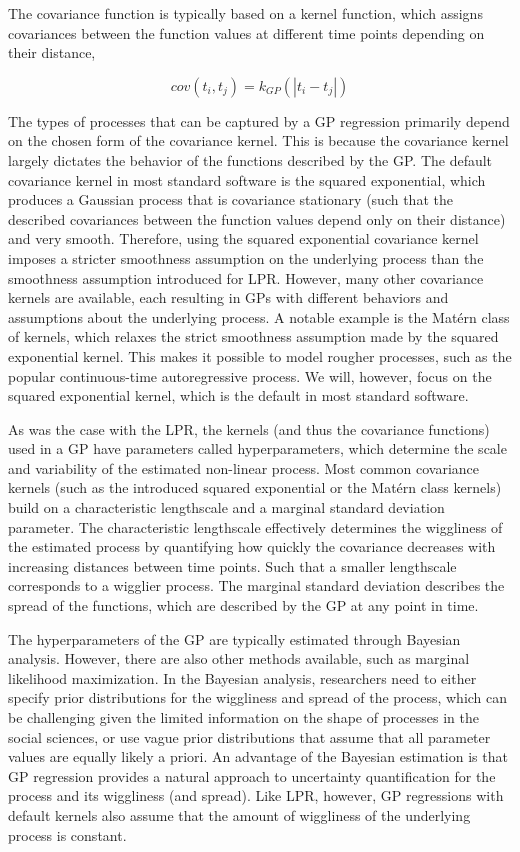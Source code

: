 \documentclass[man, floatsintext]{apa7}
\begin{document}
The covariance function is typically based on a kernel function, which assigns
covariances between the function values at different time points depending on
their distance,

\begin{equation}
  cov(t_i, t_j) = k_{GP}(|t_i - t_j|)
\end{equation}

\noindent The types of processes that can be captured by a GP regression
primarily depend on the chosen form of the covariance kernel. This is because
the covariance kernel largely dictates the behavior of the functions described
by the GP\@. The default covariance kernel in most standard software is the
squared exponential, which produces a Gaussian process that is covariance
stationary (such that the described covariances between the function values
depend only on their distance) and very smooth. Therefore, using the squared
exponential covariance kernel imposes a stricter smoothness assumption on the
underlying process than the smoothness assumption introduced for LPR\@.
However, many other covariance kernels are available, each resulting in GPs
with different behaviors and assumptions about the underlying process. A
notable example is the Matérn class of kernels, which relaxes the strict
smoothness assumption made by the squared exponential kernel. This makes it
possible to model rougher processes, such as the popular continuous-time
autoregressive process. We will, however, focus on the squared exponential
kernel, which is the default in most standard software.

As was the case with the LPR, the kernels (and thus the covariance functions)
used in a GP have parameters called hyperparameters, which determine the scale
and variability of the estimated non-linear process. Most common covariance
kernels (such as the introduced squared exponential or the Matérn class
kernels) build on a characteristic lengthscale and a marginal standard
deviation parameter. The characteristic lengthscale effectively determines the
wiggliness of the estimated process by quantifying how quickly the covariance
decreases with increasing distances between time points. Such that a smaller
lengthscale corresponds to a wigglier process. The marginal standard deviation
describes the spread of the functions, which are described by the GP at any
point in time.

The hyperparameters of the GP are typically estimated through Bayesian
analysis. However, there are also other methods available, such as marginal
likelihood maximization. In the Bayesian analysis, researchers need to either
specify prior distributions for the wiggliness and spread of the process, which
can be challenging given the limited information on the shape of processes in
the social sciences, or use vague prior distributions that assume that all
parameter values are equally likely a priori. An advantage of the Bayesian
estimation is that GP regression provides a natural approach to uncertainty
quantification for the process and its wiggliness (and spread). Like LPR,
however, GP regressions with default kernels also assume that the amount of
wiggliness of the underlying process is constant.
\end{document}
